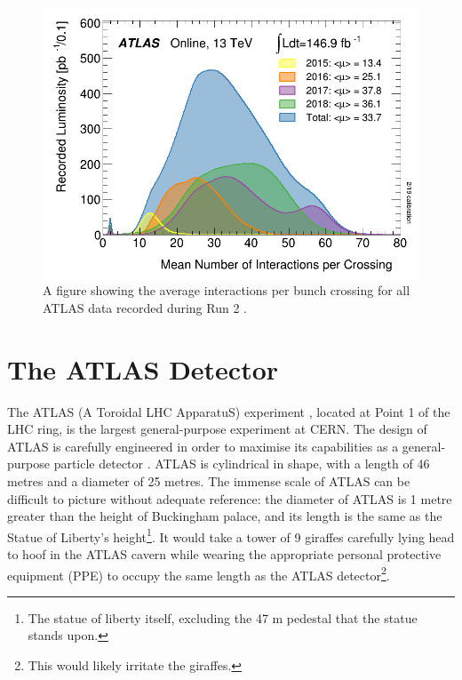 \documentclass[12pt,a4paper,epsf,portrait,times,epsfig]{report}
\begin{document}
		\begin{figure}
			\centering
			\includegraphics[scale=0.4]{ATLAS_Pileup_Run2.png}
			\caption{A figure showing the average interactions per bunch crossing for all ATLAS data recorded during Run 2 \cite{ATLASLumiPublic}.}
			\label{Fig:ATLASPileup}
		\end{figure}

		\section{The ATLAS Detector}

		The ATLAS (A Toroidal LHC ApparatuS) experiment \cite{ATLAS_Collab}, located at Point 1 of the LHC ring, is the largest general-purpose experiment at CERN. The design of ATLAS is carefully engineered in order to maximise its capabilities as a general-purpose particle detector \cite{ATLAS-TDR-01, ATLAS-TDR-02, Article:ATLASDesignPaper}. ATLAS is cylindrical in shape, with a length of 46 metres and a diameter of 25 metres. The immense scale of ATLAS can be difficult to picture without adequate reference: the diameter of ATLAS is 1 metre greater than the height of Buckingham palace, and its length is the same as the Statue of Liberty's height\footnote{The statue of liberty itself, excluding the 47 m pedestal that the statue stands upon.}. It would take a tower of 9 giraffes carefully lying head to hoof in the ATLAS cavern while wearing the appropriate personal protective equipment (PPE) to occupy the same length as the ATLAS detector\footnote{This would likely irritate the giraffes.}. 

\end{document}

